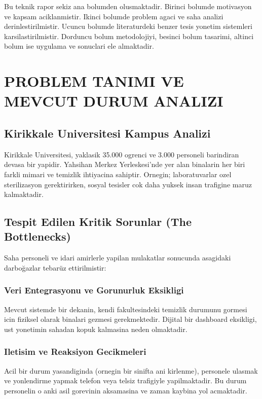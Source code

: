 \documentclass[12pt,a4paper,oneside]{report}
\begin{document}
Bu teknik rapor sekiz ana bolumden olusmaktadir. Birinci bolumde motivasyon ve kapsam aciklanmistir. Ikinci bolumde problem agaci ve saha analizi derinlestirilmistir. Ucuncu bolumde literaturdeki benzer tesis yonetim sistemleri karsilastirilmistir. Dorduncu bolum metodolojiyi, besinci bolum tasarimi, altinci bolum ise uygulama ve sonuclari ele almaktadir.

\chapter{PROBLEM TANIMI VE MEVCUT DURUM ANALIZI}
\label{chap:problem}

\section{Kirikkale Universitesi Kampus Analizi}

Kirikkale Universitesi, yaklasik 35.000 ogrenci ve 3.000 personeli barindiran devasa bir yapidir. Yahsihan Merkez Yerleskesi'nde yer alan binalarin her biri farkli mimari ve temizlik ihtiyacina sahiptir. Ornegin; laboratuvarlar ozel sterilizasyon gerektirirken, sosyal tesisler cok daha yuksek insan trafigine maruz kalmaktadir.

\section{Tespit Edilen Kritik Sorunlar (The Bottlenecks)}

Saha personeli ve idari amirlerle yapilan mulakatlar sonucunda asagidaki darboğazlar tebarüz ettirilmistir:

\subsection{Veri Entegrasyonu ve Gorunurluk Eksikligi}
Mevcut sistemde bir dekanin, kendi fakultesindeki temizlik durumunu gormesi icin fiziksel olarak binalari gezmesi gerekmektedir. Dijital bir dashboard eksikligi, ust yonetimin sahadan kopuk kalmasina neden olmaktadir.

\subsection{Iletisim ve Reaksiyon Gecikmeleri}
Acil bir durum yasandiginda (ornegin bir sinifta ani kirlenme), personele ulasmak ve yonlendirme yapmak telefon veya telsiz trafigiyle yapilmaktadir. Bu durum personelin o anki asil gorevinin aksamasina ve zaman kaybina yol acmaktadir.
\end{document}
